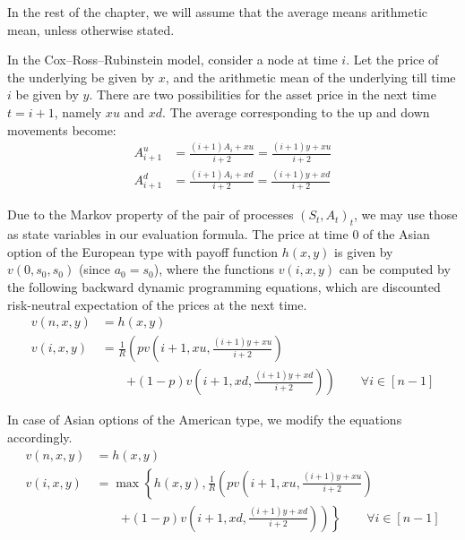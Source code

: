 In the rest of the chapter, we will assume that the average means arithmetic mean, unless otherwise stated.

In the Cox–Ross–Rubinstein model, consider a node at time $ i $. Let the price of the underlying be given by $ x $, and the arithmetic mean of the underlying till time $ i $ be given by $ y $. There are two possibilities for the asset price in the next time $ t = i + 1 $, namely $ x u $ and $ x d $. The average corresponding to the up and down movements become:
\begin{align*}
	A_{i+1}^u  &=  \frac{(i+1) A_i + x u}{i+2}  =  \frac{(i+1) y + x u}{i+2}  \\
	A_{i+1}^d  &=  \frac{(i+1) A_i + x d}{i+2}  =  \frac{(i+1) y + x d}{i+2}
\end{align*}

Due to the Markov property of the pair of processes $ (S_t, A_t)_t $, we may use those as state variables in our evaluation formula. The price at time $ 0 $ of the Asian option of the European type with payoff function $ h(x, y) $ is given by $ v(0, s_0, s_0) $ (since $ a_0 = s_0 $), where the functions $ v(i, x, y) $ can be computed by the following backward dynamic programming equations, which are discounted risk-neutral expectation of the prices at the next time.
\begin{subequations}
	\label{eq:asian-dp-eu}
	\begin{align}
		v(n, x, y)  &=  h(x,y)  \\
		v(i, x, y)  &=  \frac{1}{R} \left(  p v \left( i + 1, x u, \frac{(i + 1) y + x u}{i + 2} \right)  \right.  \\
		&  \qquad  \left. + (1-p) v \left( i + 1, x d, \frac{(i + 1) y + x d}{i + 2} \right)  \right)  \qquad   \forall i \in [n - 1]  \nonumber
	\end{align}
\end{subequations}

In case of Asian options of the American type, we modify the equations accordingly.
\begin{subequations}
	\label{eq:asian-dp-am}
	\begin{align}
		v(n, x, y)  &=  h(x,y)  \\
		v(i, x, y)  &=  \max \left\lbrace  h(x, y), \frac{1}{R} \left(  p v \left( i + 1, x u, \frac{(i + 1) y + x u}{i + 2} \right)  \right. \right. \\
		&  \qquad  \left. \left. + (1-p) v \left( i + 1, x d, \frac{(i + 1) y + x d}{i + 2} \right)  \right)  \right\rbrace  \qquad  \forall i \in [n - 1]  \nonumber
	\end{align}
\end{subequations}

